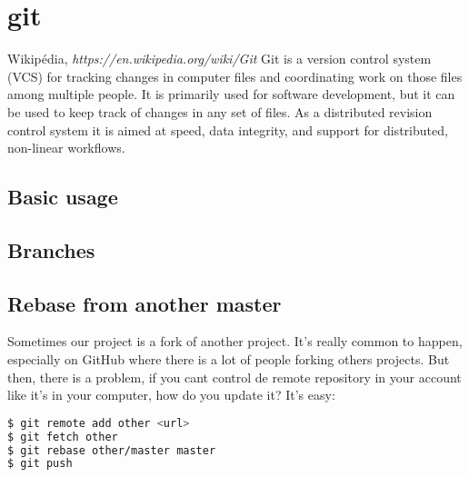\section{git}
\begin{chapquote}{Wikipédia, \textit{https://en.wikipedia.org/wiki/Git}}
Git is a version control system (VCS) for tracking changes in computer files and coordinating work on those files among multiple people. It is primarily used for software development, but it can be used to keep track of changes in any set of files. As a distributed revision control system it is aimed at speed, data integrity, and support for distributed, non-linear workflows.
\end{chapquote}
\subsection{Basic usage}

\subsection{Branches}

\subsection{Rebase from another master}
Sometimes our project is a fork of another project. It's really common to happen, especially on GitHub where there is a lot of people forking others projects.\newline
But then, there is a problem, if you cant control de remote repository in your account like it's in your computer, how do you update it? It's easy:
\begin{lstlisting}[language=Bash]
$ git remote add other <url>
$ git fetch other
$ git rebase other/master master
$ git push
\end{lstlisting}
